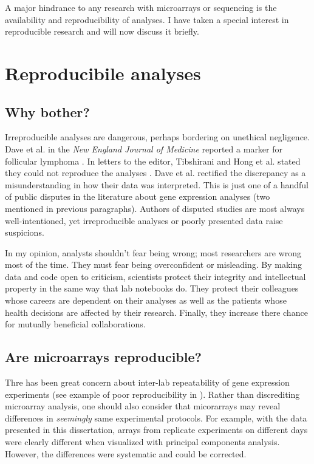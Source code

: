 A major hindrance to any 
research with microarrays or sequencing is the availability
and reproducibility of analyses. I have taken
a special interest in reproducible research and will now discuss it briefly.

\section{Reproducibile analyses}

\subsection{Why bother?}

Irreproducible analyses are dangerous, perhaps bordering on unethical negligence. 
Dave et al. in the \textit{New England
Journal of Medicine} reported a marker for follicular lymphoma \cite{Dave:2004vl}. 
In letters to the editor, Tibshirani and Hong et al. stated they 
could not reproduce the analyses \cite{Tibshirani:2005el}. 
Dave et al. rectified the discrepancy as a misunderstanding
in how their data was interpreted. This is just one of a handful of
public disputes in the literature about gene expression analyses (two mentioned
in previous paragraphs).
Authors of disputed studies are most always well-intentioned, yet 
irreproducible analyses or poorly presented data raise suspicions.

In my opinion, analysts shouldn't fear being wrong; most researchers
are wrong most of the time. They must fear being overconfident or misleading. 
By making data and code open to criticism,
scientists protect their integrity and intellectual property in the same
way that lab notebooks do. They protect their colleagues
whose careers are dependent on their analyses as well as the patients
whose health decisions are affected by their research.
Finally, they increase there chance for mutually beneficial collaborations.

\subsection{Are microarrays reproducible?}

Thre has been great concern about inter-lab repeatability of 
gene expression experiments
(see example of poor reproducibility in 
\cite{Evsikov:2003ic,Fortunel:2003eu,Ivanova:2003bh,RamalhoSantos:2002dy}). 
Rather than discrediting microarray analysis,
one should also consider that micorarrays
may reveal differences in \textit{seemingly} same experimental protocols.
For example, with the data presented in this dissertation, arrays from
replicate experiments on different days were clearly different when
visualized with principal components analysis. However, the differences
were systematic and could be corrected.

